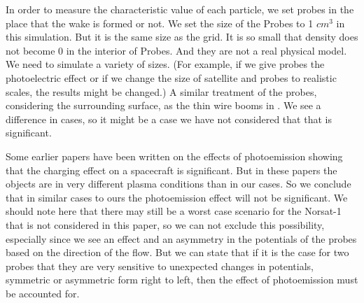 
In order to measure the characteristic value of each particle, we set probes in the
place that the wake is formed or not.
We set the size of the Probes to 1 $cm^3$ in this simulation. But it is the same size as the grid.
It is so small that density does not become 0 in the interior of Probes. And they are not a real 
physical model. We need to simulate a variety of sizes.
(For example, if we give probes the photoelectric effect or if we change the size of satellite and
probes to realistic scales, the results might be changed.) A similar treatment of the probes, considering the surrounding surface,
as the thin wire booms in \citet{miyake_plasma_2013}.
We see a difference in cases, so it might be a case we have not considered that that is significant.

Some earlier papers have been written on the effects of photoemission showing that the charging effect 
on a spacecraft is significant.\citep{ergun_spacecraft_2010} But in these papers the objects are in very different
plasma conditions than in our cases. So we conclude that in similar cases to ours the photoemission effect
will not be significant. We should note here that there may still be a worst case scenario for the Norsat-1
that is not considered in this paper, so we can not exclude this possibility, especially since we see an effect and an
asymmetry in the potentials of the probes based on the direction of the flow. But we can state that if 
it is the case for two probes that they are very sensitive to unexpected changes in potentials, symmetric or asymmetric form 
right to left, then the effect of photoemission must be accounted for.